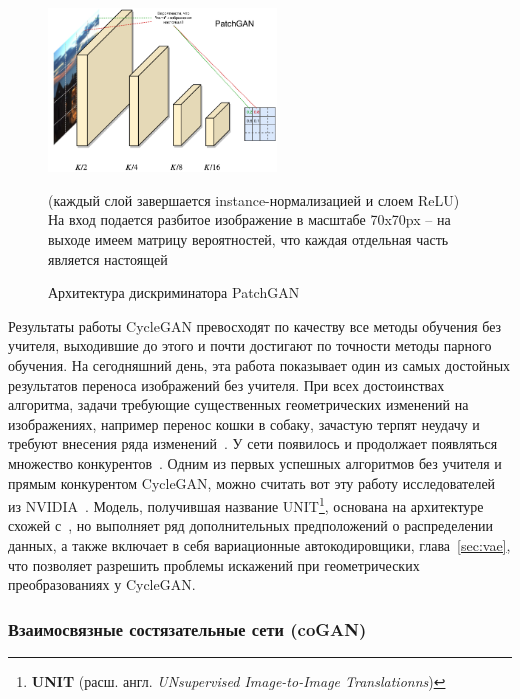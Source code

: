 \documentclass[11pt,a4paper]{extarticle}
\begin{document}
			\begin{figure}[ht]
				\centering
				\includegraphics[width=0.54\textwidth]{img/cyclegan_dis}
				\caption{Архитектура дискриминатора PatchGAN}{
					\small{
						(каждый слой завершается instance-нормализацией и слоем ReLU)\\
						На вход подается разбитое изображение в масштабе 70x70px -- на выходе имеем матрицу вероятностей, что каждая отдельная часть является настоящей
					}
				}
				\label{pic:cyclegan_dis}
			\end{figure}

			Результаты работы CycleGAN превосходят по качеству все методы обучения без учителя, выходившие до этого
			и почти достигают по точности методы парного обучения.
			На сегодняшний день, эта работа показывает один из самых достойных результатов переноса изображений без учителя.
			При всех достоинствах алгоритма, задачи требующие существенных геометрических изменений на изображениях, например перенос кошки в собаку, зачастую терпят неудачу и требуют внесения ряда изменений~\cite{CycleGAN}.
			\newline\newline
			У сети появилось и продолжает появляться множество конкурентов~\cite{BicycleGAN,MUNIT,UNIT,DRIT}.
			Одним из первых успешных алгоритмов без учителя и прямым конкурентом CycleGAN, можно считать вот эту работу исследователей из NVIDIA~\cite{UNIT}.
			Модель, получившая название UNIT\footnote{
				\textbf{UNIT} (расш. англ. \textit{UNsupervised Image-to-Image Translationns})
			}, основана на архитектуре схожей с~\cite{CycleGAN}, но выполняет ряд дополнительных предположений о распределении данных, а также включает в себя
			вариационные автокодировщики, глава~\ref{sec:vae}, что позволяет разрешить проблемы искажений при геометрических преобразованиях у CycleGAN.
		
		\subsubsection*{Взаимосвязные состязательные сети (coGAN)}\label{sec:cogan}
\end{document}
